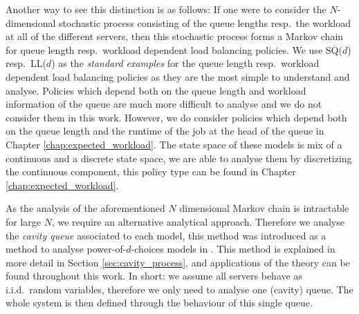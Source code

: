 \documentclass[12pt]{report}
\begin{document}
Another way to see this distinction is as follows: If one were to consider the $N$-dimensional stochastic process consisting of the queue lengths resp.~the workload at all of the different servers, then this stochastic process forms a Markov chain for queue length resp.~workload dependent load balancing policies. We use SQ($d$) resp.~LL($d$) as the \textit{standard examples} for the queue length resp.~workload dependent load balancing policies as they are the most simple to understand and analyse. Policies which depend both on the queue length and workload information of the queue are much more difficult to analyse and we do not consider them in this work. However, we do consider policies which depend both on the queue length and the runtime of the job at the head of the queue in Chapter \ref{chap:expected_workload}. The state space of these models is mix of a continuous and a discrete state space, we are able to analyse them by discretizing the continuous component, this policy type can be found in Chapter \ref{chap:expected_workload}.

As the analysis of the aforementioned $N$ dimensional Markov chain is intractable for large $N$, we require an alternative analytical approach. Therefore we analyse the \textit{cavity queue} associated to each model, this method was introduced as a method to analyse power-of-$d$-choices models in \cite{bramsonLB}. This method is explained in more detail in Section \ref{sec:cavity_process}, and applications of the theory can be found throughout this work. In short: we assume all servers behave as i.i.d.~random variables, therefore we only need to analyse one (cavity) queue. The whole system is then defined through the behaviour of this single queue.

\end{document}
